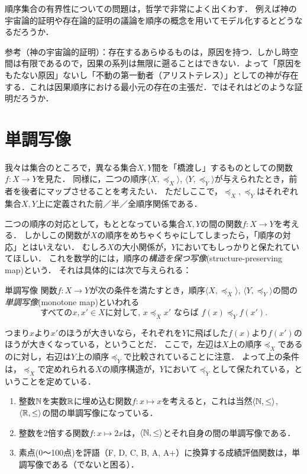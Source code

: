 \documentclass[dvipdfmx,11pt,a4paper]{jsarticle}
\begin{document}
\begin{rei}{}{}
順序集合の有界性についての問題は，哲学で非常によく出くわす．
例えば神の宇宙論的証明や存在論的証明の議論を順序の概念を用いてモデル化するとどうなるだろうか．

参考（神の宇宙論的証明）：存在するあらゆるものは，原因を持つ．しかし時空間は有限であるので，因果の系列は無限に遡ることはできない．よって「原因をもたない原因」ないし「不動の第一動者（アリストテレス）」としての神が存在する．これは因果順序における最小元の存在の主張だ．ではそれはどのような証明だろうか．
\end{rei}


\section{単調写像}
我々は集合のところで，異なる集合$X, Y$間を「橋渡し」するものとしての関数$f:X \to Y$を見た．
同様に，二つの順序$\langle X, \preceq_X \rangle$, $\langle Y, \preceq_Y \rangle$が与えられたとき，前者を後者にマップさせることを考えたい．
ただしここで，$\preceq_X, \preceq_Y$はそれぞれ集合$X,Y$上に定義された前／半／全順序関係である．

二つの順序の対応として，もととなっている集合$X, Y$の間の関数$f:X \to Y$を考える．
しかしこの関数が$X$の順序をめちゃくちゃにしてしまったら，「順序の対応」とはいえない．
むしろ$X$の大小関係が，$Y$においてもしっかりと保たれていてほしい．
これを数学的には，順序の\emph{構造を保つ写像}(structure-preserving map)という．
それは具体的には次で与えられる：
\begin{dfn}{単調写像}{}
関数$f:X \to Y$が次の条件を満たすとき，順序$\langle X, \preceq_X \rangle$, $\langle Y, \preceq_Y \rangle$の間の\emph{単調写像}(monotone map)といわれる
\[
 \text{すべての}x, x' \in X \text{に対して, }  x \preceq_X x' \text{ ならば } f(x) \preceq_Y f(x').
\]
\end{dfn}
つまり$x$より$x'$のほうが大きいなら，それぞれを$Y$に飛ばした$f(x)$より$f(x')$のほうが大きくなっている，ということだ．
ここで，左辺は$X$上の順序$\preceq_X$であるのに対し，右辺は$Y$上の順序$\preceq_Y$で比較されていることに注意．
よって上の条件は，$\preceq_X$で定めれられる$X$の順序構造が，$Y$において$\preceq_Y$として保たれている，ということを定めている．

\begin{rei}{}{}
 \begin{enumerate}
  \item 整数$\mathbb{N}$を実数$\mathbb{R}$に埋め込む関数$f:x \mapsto x$を考えると，これは当然$\langle \mathbb{N}, \leq \rangle$, $\langle \mathbb{R}, \leq \rangle$の間の単調写像になっている．
  \item 整数を2倍する関数$f:x \mapsto 2x$は，$\langle \mathbb{N}, \leq \rangle$とそれ自身の間の単調写像である．
  \item 素点(0〜100点)を評語（F, D, C, B, A, A+）に換算する成績評価関数は，単調写像である（でないと困る）．
 \end{enumerate}
\end{rei}
\end{document}
